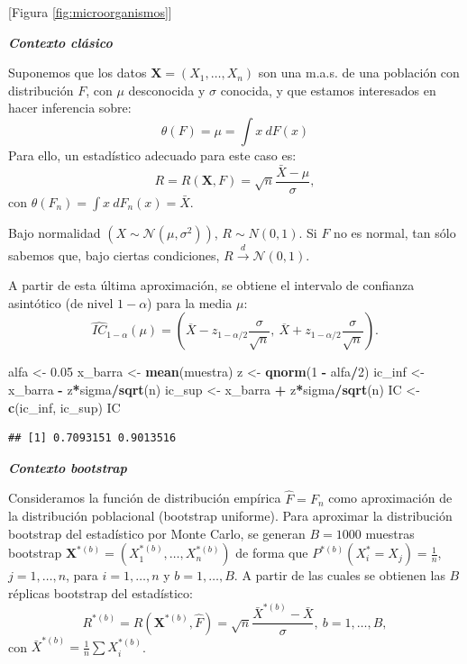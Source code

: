 \documentclass[]{book}
\newenvironment{Shaded}{\begin{snugshade}}{\end{snugshade}}
\newcommand{\KeywordTok}[1]{\textcolor[rgb]{0.13,0.29,0.53}{\textbf{#1}}}
\newcommand{\DecValTok}[1]{\textcolor[rgb]{0.00,0.00,0.81}{#1}}
\newcommand{\FloatTok}[1]{\textcolor[rgb]{0.00,0.00,0.81}{#1}}
\newcommand{\StringTok}[1]{\textcolor[rgb]{0.31,0.60,0.02}{#1}}
\newcommand{\OperatorTok}[1]{\textcolor[rgb]{0.81,0.36,0.00}{\textbf{#1}}}
\newcommand{\NormalTok}[1]{#1}
\theoremstyle{definition}
\theoremstyle{definition}
\theoremstyle{definition}
\theoremstyle{remark}
\begin{document}
{[}Figura \ref{fig:microorganismos}{]}

\textbf{\emph{Contexto clásico}}

Suponemos que los datos \(\mathbf{X}=\left( X_1,\ldots ,X_n \right)\)
son una m.a.s. de una población con distribución \(F\), con \(\mu\)
desconocida y \(\sigma\) conocida, y que estamos interesados en hacer
inferencia sobre:
\[\theta \left( F \right) =\mu =\int x~dF\left( x \right)\] Para ello,
un estadístico adecuado para este caso es:
\[R=R\left( \mathbf{X},F \right) =\sqrt{n}\frac{\bar{X}-\mu }{\sigma},\]
con
\(\theta \left( F_n \right) =\int x~dF_n\left( x \right) = \bar{X}\).

Bajo normalidad
\(\left( X\sim \mathcal{N}\left( \mu ,\sigma^2 \right) \right)\),
\(R\sim N\left( 0,1 \right)\). Si \(F\) no es normal, tan sólo sabemos
que, bajo ciertas condiciones,
\(R\overset{d}{\rightarrow }\mathcal{N}\left( 0, 1 \right)\).

A partir de esta última aproximación, se obtiene el intervalo de
confianza asintótico (de nivel \(1-\alpha\)) para la media \(\mu\):
\[\hat{IC}_{1-\alpha}\left(  \mu\right)  = 
\left(  \overline{X}-z_{1-\alpha/2}\dfrac{\sigma}{\sqrt{n}},\ \overline{X} 
+ z_{1-\alpha/2}\dfrac{\sigma}{\sqrt{n}} \right).\]

\begin{Shaded}
\begin{Highlighting}[]
\NormalTok{alfa <-}\StringTok{ }\FloatTok{0.05}
\NormalTok{x_barra <-}\StringTok{ }\KeywordTok{mean}\NormalTok{(muestra)}
\NormalTok{z <-}\StringTok{ }\KeywordTok{qnorm}\NormalTok{(}\DecValTok{1} \OperatorTok{-}\StringTok{ }\NormalTok{alfa}\OperatorTok{/}\DecValTok{2}\NormalTok{)}
\NormalTok{ic_inf <-}\StringTok{ }\NormalTok{x_barra }\OperatorTok{-}\StringTok{ }\NormalTok{z}\OperatorTok{*}\NormalTok{sigma}\OperatorTok{/}\KeywordTok{sqrt}\NormalTok{(n)}
\NormalTok{ic_sup <-}\StringTok{ }\NormalTok{x_barra }\OperatorTok{+}\StringTok{ }\NormalTok{z}\OperatorTok{*}\NormalTok{sigma}\OperatorTok{/}\KeywordTok{sqrt}\NormalTok{(n)}
\NormalTok{IC <-}\StringTok{ }\KeywordTok{c}\NormalTok{(ic_inf, ic_sup)}
\NormalTok{IC}
\end{Highlighting}
\end{Shaded}

\begin{verbatim}
## [1] 0.7093151 0.9013516
\end{verbatim}

\textbf{\emph{Contexto bootstrap}}

Consideramos la función de distribución empírica \(\hat{F}=F_n\) como
aproximación de la distribución poblacional (bootstrap uniforme). Para
aproximar la distribución bootstrap del estadístico por Monte Carlo, se
generan \(B=1000\) muestras bootstrap
\(\mathbf{X}^{\ast (b)}=\left( X_1^{\ast (b)},\ldots ,X_n^{\ast (b)} \right)\)
de forma que
\(P^{\ast (b)}\left( X_i^{\ast}=X_j \right) = \frac{1}{n}\),
\(j=1,\ldots ,n\), para \(i=1,\ldots, n\) y \(b=1,\ldots, B\). A partir
de las cuales se obtienen las \(B\) réplicas bootstrap del estadístico:
\[R^{\ast (b)}=R\left( \mathbf{X}^{\ast (b)},\hat{F} \right) =\sqrt{n}\frac{
\bar{X}^{\ast  (b)}-\bar{X}}{\sigma }, \ b=1,\ldots, B, \] con
\(\bar{X}^{\ast (b)} = \frac{1}{n}\sum X_i^{\ast (b)}\).
\end{document}

